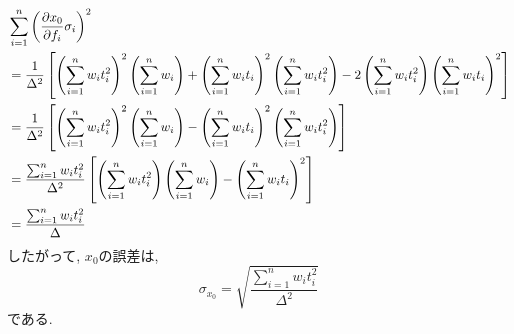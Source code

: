 \begin{align}
    &
    \sum_{i=1}^{n}
    \left(\frac{\partial x_{0}}{\partial f_{i}} \sigma_{i}\right)^{2}
    \notag \\
    &=
    \frac{1}{\Delta^{2}}
    \left[
        \left(\sum_{i=1}^{n} w_{i} t_{i}^{2}\right)^{2}
        \left(\sum_{i=1}^{n} w_{i}\right)
        +
        \left(\sum_{i=1}^{n} w_{i} t_{i}\right)^{2}
        \left(\sum_{i=1}^{n} w_{i} t_{i}^{2} \right)
        -
        2
        \left(\sum_{i=1}^{n} w_{i} t_{i}^{2}\right)
        \left(\sum_{i=1}^{n} w_{i} t_{i}\right)^{2}
    \right]
    \notag
    \\ &=
    \frac{1}{\Delta^{2}}
    \left[
        \left(\sum_{i=1}^{n} w_{i} t_{i}^{2}\right)^{2}
        \left(\sum_{i=1}^{n} w_{i}\right)
        -
        \left(\sum_{i=1}^{n} w_{i} t_{i}\right)^{2}
        \left(\sum_{i=1}^{n} w_{i} t_{i}^{2}\right)
    \right]
    \notag
    \\ &=
    \frac{\sum_{i=1}^{n} w_{i} t_{i}^{2}}{\Delta^{2}}
    \left[
        \left(\sum_{i=1}^{n} w_{i} t_{i}^{2}\right)
        \left(\sum_{i=1}^{n} w_{i}\right)
        -
        \left(\sum_{i=1}^{n} w_{i} t_{i}\right)^{2}
    \right]
    \notag
    \\ &=
    \frac{\sum_{i=1}^{n} w_{i} t_{i}^{2}}{\Delta}
\end{align}
したがって, $x_{0}$の誤差は, 
\begin{equation}
    \sigma_{x_{0}} =
    \sqrt{\frac{\sum_{i=1}^{n} w_{i} t_{i}^{2}}{\Delta^{2}}}
\end{equation}
である. 

